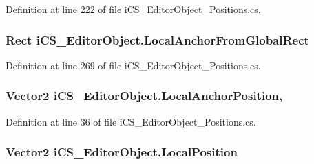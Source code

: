 Definition at line 222 of file i\+C\+S\+\_\+\+Editor\+Object\+\_\+\+Positions.\+cs.

\hypertarget{classi_c_s___editor_object_ace5a2212ace78e3c881370ffebf848d3}{
\subsubsection[{Local\+Anchor\+From\+Global\+Rect}]{\setlength{\rightskip}{0pt plus 5cm}Rect i\+C\+S\+\_\+\+Editor\+Object.\+Local\+Anchor\+From\+Global\+Rect\hspace{0.3cm}{\ttfamily [set]}}}\label{classi_c_s___editor_object_ace5a2212ace78e3c881370ffebf848d3}


Definition at line 269 of file i\+C\+S\+\_\+\+Editor\+Object\+\_\+\+Positions.\+cs.

\hypertarget{classi_c_s___editor_object_a4f1ef3bb56c3f5e7ae66982578f9d158}{
\subsubsection[{Local\+Anchor\+Position}]{\setlength{\rightskip}{0pt plus 5cm}Vector2 i\+C\+S\+\_\+\+Editor\+Object.\+Local\+Anchor\+Position\hspace{0.3cm}{\ttfamily [get]}, {\ttfamily [set]}}}\label{classi_c_s___editor_object_a4f1ef3bb56c3f5e7ae66982578f9d158}


Definition at line 36 of file i\+C\+S\+\_\+\+Editor\+Object\+\_\+\+Positions.\+cs.

\hypertarget{classi_c_s___editor_object_ad1e8c6712041588856383b29da35409c}{
\subsubsection[{Local\+Position}]{\setlength{\rightskip}{0pt plus 5cm}Vector2 i\+C\+S\+\_\+\+Editor\+Object.\+Local\+Position\hspace{0.3cm}{\ttfamily [get]}}}\label{classi_c_s___editor_object_ad1e8c6712041588856383b29da35409c}


